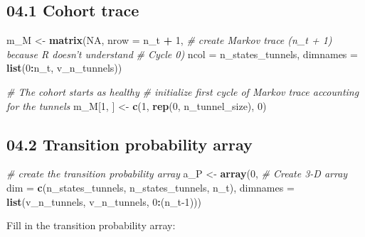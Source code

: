 \documentclass[
]{article}
\newenvironment{Shaded}{\begin{snugshade}}{\end{snugshade}}
\newcommand{\CommentTok}[1]{\textcolor[rgb]{0.56,0.35,0.01}{\textit{#1}}}
\newcommand{\DataTypeTok}[1]{\textcolor[rgb]{0.13,0.29,0.53}{#1}}
\newcommand{\DecValTok}[1]{\textcolor[rgb]{0.00,0.00,0.81}{#1}}
\newcommand{\KeywordTok}[1]{\textcolor[rgb]{0.13,0.29,0.53}{\textbf{#1}}}
\newcommand{\NormalTok}[1]{#1}
\newcommand{\OperatorTok}[1]{\textcolor[rgb]{0.81,0.36,0.00}{\textbf{#1}}}
\newcommand{\OtherTok}[1]{\textcolor[rgb]{0.56,0.35,0.01}{#1}}
\newcommand{\StringTok}[1]{\textcolor[rgb]{0.31,0.60,0.02}{#1}}
\begin{document}
\hypertarget{cohort-trace}{%
\subsection{04.1 Cohort trace}\label{cohort-trace}}

\begin{Shaded}
\begin{Highlighting}[]
\NormalTok{m_M <-}\StringTok{ }\KeywordTok{matrix}\NormalTok{(}\OtherTok{NA}\NormalTok{, }
              \DataTypeTok{nrow =}\NormalTok{ n_t }\OperatorTok{+}\StringTok{ }\DecValTok{1}\NormalTok{,  }\CommentTok{# create Markov trace (n_t + 1) because R doesn't understand }
                               \CommentTok{# Cycle 0)}
              \DataTypeTok{ncol =}\NormalTok{ n_states_tunnels,                  }
              \DataTypeTok{dimnames =} \KeywordTok{list}\NormalTok{(}\DecValTok{0}\OperatorTok{:}\NormalTok{n_t, v_n_tunnels)) }

\CommentTok{# The cohort starts as healthy}
\CommentTok{# initialize first cycle of Markov trace accounting for the tunnels}
\NormalTok{m_M[}\DecValTok{1}\NormalTok{, ] <-}\StringTok{ }\KeywordTok{c}\NormalTok{(}\DecValTok{1}\NormalTok{, }\KeywordTok{rep}\NormalTok{(}\DecValTok{0}\NormalTok{, n_tunnel_size), }\DecValTok{0}\NormalTok{)     }
\end{Highlighting}
\end{Shaded}

\hypertarget{transition-probability-array}{%
\subsection{04.2 Transition probability
array}\label{transition-probability-array}}

\begin{Shaded}
\begin{Highlighting}[]
\CommentTok{# create the transition probability array}
\NormalTok{a_P <-}\StringTok{ }\KeywordTok{array}\NormalTok{(}\DecValTok{0}\NormalTok{,                                          }\CommentTok{# Create 3-D array}
             \DataTypeTok{dim =} \KeywordTok{c}\NormalTok{(n_states_tunnels, n_states_tunnels, n_t),               }
             \DataTypeTok{dimnames =} \KeywordTok{list}\NormalTok{(v_n_tunnels, v_n_tunnels, }\DecValTok{0}\OperatorTok{:}\NormalTok{(n_t}\DecValTok{-1}\NormalTok{)))  }
\end{Highlighting}
\end{Shaded}

Fill in the transition probability array:
\end{document}
